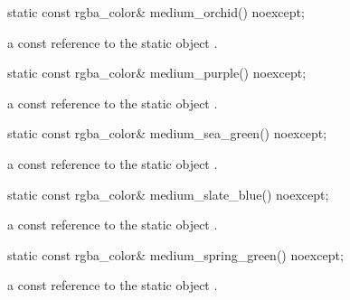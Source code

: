 \begin{itemdecl}
    static const rgba_color& medium_orchid() noexcept;
\end{itemdecl}
\begin{itemdescr}
    \pnum
    \returns
    a const reference to the static  object .
\end{itemdescr}

\begin{itemdecl}
    static const rgba_color& medium_purple() noexcept;
\end{itemdecl}
\begin{itemdescr}
    \pnum
    \returns
    a const reference to the static  object .
\end{itemdescr}

\begin{itemdecl}
    static const rgba_color& medium_sea_green() noexcept;
\end{itemdecl}
\begin{itemdescr}
    \pnum
    \returns
    a const reference to the static  object .
\end{itemdescr}

\begin{itemdecl}
    static const rgba_color& medium_slate_blue() noexcept;
\end{itemdecl}
\begin{itemdescr}
    \pnum
    \returns
    a const reference to the static  object .
\end{itemdescr}

\begin{itemdecl}
    static const rgba_color& medium_spring_green() noexcept;
\end{itemdecl}
\begin{itemdescr}
    \pnum
    \returns
    a const reference to the static  object .
\end{itemdescr}

